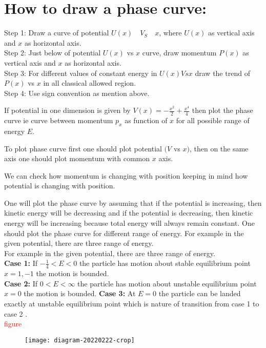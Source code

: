 \section{How to draw a phase curve:}
Step 1: Draw a curve of potential $U(x)\quad V_{S} \quad x$, where $U(x)$ as vertical axis and $x$ as horizontal axis.\\
Step 2: Just below of potential $U(x)$ vs $x$ curve, draw momentum $P(x)$ as vertical axis and $x$ as horizontal axis.\\
Step 3: For different values of constant energy in $U(x) V s x$ draw the trend of $P(x)$ vs $x$ in all classical allowed region.\\
Step 4: Use sign convention as mention above.
\begin{example}
If potential in one dimension is given by $V(x)=-\frac{x^{2}}{2}+\frac{x^{4}}{4}$ then plot the phase curve ie curve between momentum $p_{x}$ as function of $x$ for all possible range of energy $E$.
\end{example}
\begin{answer}
	To plot phase curve first one should plot potential $(V$ vs $x)$, then on the same axis one should plot momentum with common $x$ axis.
	
	We can check how momentum is changing with position keeping in mind how potential is changing with position.
	
	One will plot the phase curve by assuming that if the potential is increasing, then kinetic energy will be decreasing and if the potential is decreasing, then kinetic energy will be increasing because total energy will always remain constant. One should plot the phase curve for different range of energy.
	For example in the given potential, there are three range of energy.\\
For example in the given potential, there are three range of energy.\\ 
\textbf{Case 1:}  If $-\frac{1}{4}<E<0$ the particle has motion about stable equilibrium point $x=1,-1$ the motion is bounded.\\
\textbf{Case 2:} If $0<E<\infty$ the particle has motion about unstable equilibrium point $x=0$ the motion is bounded.
\textbf{Case 3:} At $E=0$ the particle can be landed exactly at unstable equilibrium point which is nature of transition from case 1 to case 2 .\\
\textcolor{red}{figure}
\begin{figure}[H]
	\centering
	\texttt{[image: diagram-20220222-crop]}
\end{figure}
\end{answer}
